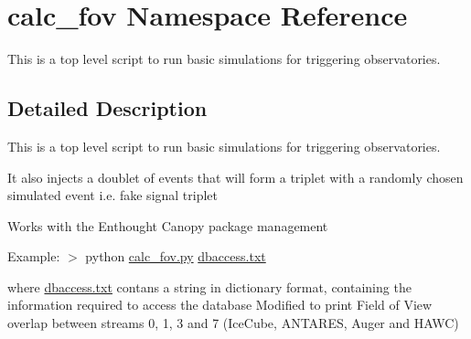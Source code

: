 \hypertarget{namespacecalc__fov}{\section{calc\-\_\-fov Namespace Reference}
\label{namespacecalc__fov}
}


\begin{DoxyVerb} This is a top level script to run basic
 simulations for triggering observatories.\end{DoxyVerb}
  




\subsection{Detailed Description}
\begin{DoxyVerb} This is a top level script to run basic
 simulations for triggering observatories.\end{DoxyVerb}
 It also injects a doublet of events that will form a triplet with a randomly chosen simulated event i.\-e. fake signal triplet

Works with the Enthought Canopy package management

Example\-: $>$ python \hyperlink{calc__fov_8py}{calc\-\_\-fov.\-py} \hyperlink{dbaccess_8txt}{dbaccess.\-txt}

where \hyperlink{dbaccess_8txt}{dbaccess.\-txt} contans a string in dictionary format, containing the information required to access the database Modified to print Field of View overlap between streams 0, 1, 3 and 7 (Ice\-Cube, A\-N\-T\-A\-R\-E\-S, Auger and H\-A\-W\-C) 
